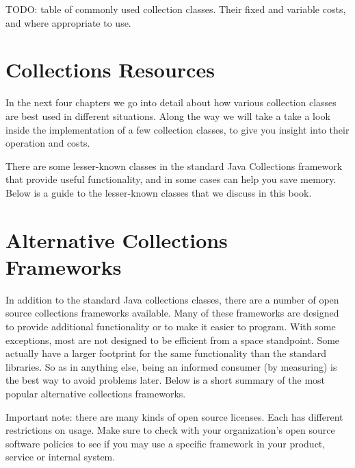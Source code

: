 TODO: table of commonly used collection classes. Their fixed and variable
costs, and where appropriate to use. 

\section{Collections Resources}

In the next four chapters we go into detail about how various
collection classes are best used in different situations. Along the way we will take a
take a look inside the implementation of a few collection classes, to give you
insight into their operation and costs.

There are some lesser-known classes in the standard Java
Collections framework that provide
useful functionality, and in some cases can help you save memory. Below is
a guide to the lesser-known classes that we discuss in this book.



\section{Alternative Collections Frameworks}
In addition to the standard Java collections classes, there are a number of
open source collections frameworks available. Many of these frameworks
are designed to provide additional functionality or to make it easier to
program. With some exceptions, most are not designed to be efficient from a
space standpoint. Some actually have a
larger footprint for the same functionality than the standard libraries. So as
in anything else, being an informed consumer (by measuring) is the best way to
avoid problems later. Below is a short summary of the most
popular alternative collections frameworks.

Important note: there are many kinds of open source licenses. Each has different
restrictions on usage. Make sure to check with your organization's open
source software policies to see if you may use a specific framework in 
your product, service or internal system.

